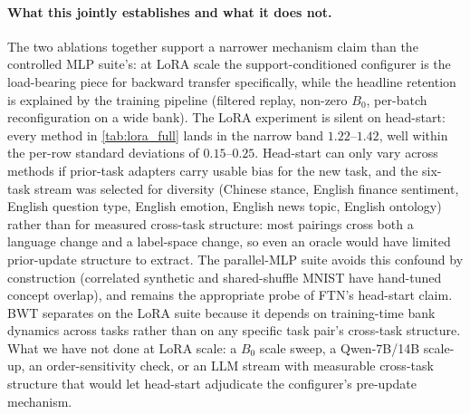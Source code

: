 \paragraph{What this jointly establishes and what it does not.}
The two ablations together support a narrower mechanism claim than the controlled MLP suite's: at LoRA scale the support-conditioned configurer is the load-bearing piece for backward transfer specifically, while the headline retention is explained by the training pipeline (filtered replay, non-zero $B_0$, per-batch reconfiguration on a wide bank). The LoRA experiment is silent on head-start: every method in \cref{tab:lora_full} lands in the narrow band $1.22$--$1.42$, well within the per-row standard deviations of $0.15$--$0.25$. Head-start can only vary across methods if prior-task adapters carry usable bias for the new task, and the six-task stream was selected for diversity (Chinese stance, English finance sentiment, English question type, English emotion, English news topic, English ontology) rather than for measured cross-task structure: most pairings cross both a language change and a label-space change, so even an oracle would have limited prior-update structure to extract. The parallel-MLP suite avoids this confound by construction (correlated synthetic and shared-shuffle MNIST have hand-tuned concept overlap), and remains the appropriate probe of FTN's head-start claim. BWT separates on the LoRA suite because it depends on training-time bank dynamics across tasks rather than on any specific task pair's cross-task structure. What we have not done at LoRA scale: a $B_0$ scale sweep, a Qwen-7B/14B scale-up, an order-sensitivity check, or an LLM stream with measurable cross-task structure that would let head-start adjudicate the configurer's pre-update mechanism.




